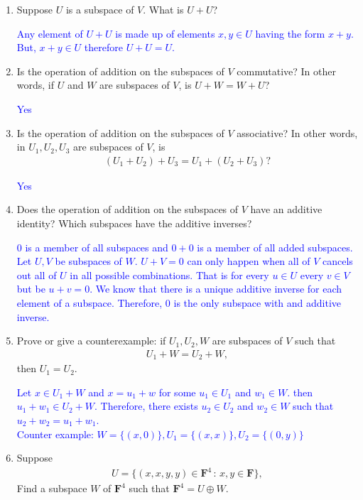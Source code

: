 \documentclass[10pt,a4paper]{report}
\newcommand{\BLUE}[1]{\textcolor{blue}{#1}}
\newcommand{\F}{\textbf{F}}
\begin{document}
\begin{enumerate}
\item Suppose $U$ is a subspace of $V$.  What is $U+U$?

\BLUE{Any element of $U+U$ is made up of elements $x,y \in U$ having the form $x+y$.  But, $x+y \in U$ therefore $U+U=U$.
}

\item Is the operation of addition on the subspaces of $V$ commutative?  In other words, if $U$ and $W$ are subspaces of $V$, is $U+W=W+U$?

\BLUE{Yes
}

\item Is the operation of addition on the subspaces of $V$ associative?  In other words, in $U_1,U_2, U_3$ are subspaces of $V$, is 
\begin{align*}
	(U_1+U_2)+U_3=U_1+(U_2+U_3)?
\end{align*}

\BLUE{Yes}

\item Does the operation of addition on the subspaces of $V$ have an additive identity?  Which subspaces have the additive inverses?

\BLUE{0 is a member of all subspaces and $0+0$ is a member of all added subspaces.\\
Let $U,V$ be subspaces of $W$. $U+V=0$ can only happen when all of $V$ cancels out all of $U$ in all possible combinations.  That is for every $u \in U$ every $v \in V$ but be $u+v=0$.  We know that there is a unique additive inverse for each element of a subspace.  Therefore, 0 is the only subspace with and additive inverse.
}

\item Prove or give a counterexample:  if $U_1,U_2, W$ are subspaces of $V$ such that 
\begin{align*}
	U_1+W=U_2+W,
\end{align*}then $U_1=U_2$.

\BLUE{Let $x \in U_1 + W$ and $x= u_1+w$ for some $u_1 \in U_1$ and $w_1 \in W$.  then $u_1 + w_1 \in U_2 + W$.  Therefore, there exists $u_2 \in U_2$ and $w_2 \in W$ such that $u_2+w_2 = u_1+w_1$. \\
Counter example: $W = \{(x,0)\}, U_1 = \{(x,x)\}, U_2 = \{(0,y)\}$
}

\item Suppose 
\begin{align*}
	U=\{(x,x,y,y)\in \F^4\,:\, x,y \in \F\},
\end{align*}Find a subspace $W$ of $\F^4$ such that $\F^4= U \oplus W$.


\end{enumerate}
\end{document}
